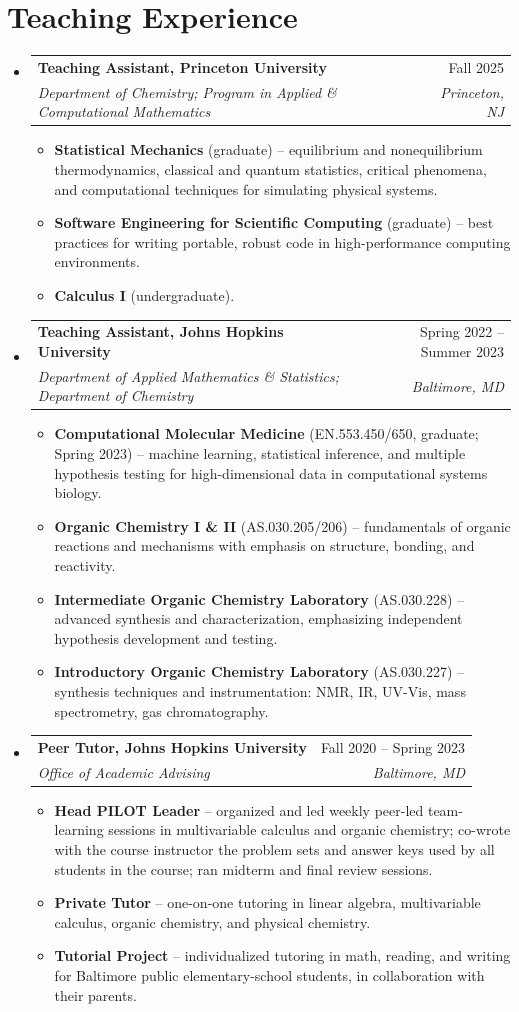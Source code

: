 \documentclass[letterpaper,10pt]{article}
\makeatletter
\newcommand{\resumeItem}[1]{\item\small{{#1 \vspace{-1pt}}}}
\newcommand{\resumeSubheading}[4]{
  \vspace{-1pt}\item
    \begin{tabular*}{0.97\textwidth}[t]{l@{\extracolsep{\fill}}r}
      \textbf{#1} & #2 \\
      \textit{\small#3} & \textit{\small #4} \\
    \end{tabular*}\vspace{-6pt}
}
\newcommand{\resumeSubHeadingListStart}{\begin{itemize}[leftmargin=0.15in, label={}]}
\newcommand{\resumeSubHeadingListEnd}{\end{itemize}}
\newcommand{\resumeItemListStart}{\begin{itemize}[itemsep=0pt, topsep=2pt]}
\newcommand{\resumeItemListEnd}{\end{itemize}\vspace{-4pt}}
\makeatother
\begin{document}
\section{Teaching Experience}
  \resumeSubHeadingListStart
    \resumeSubheading
      {Teaching Assistant, Princeton University}{Fall 2025}
      {\textnormal{Department of Chemistry; Program in Applied \& Computational Mathematics}}{Princeton, NJ}
      \resumeItemListStart
        \resumeItem{\textbf{Statistical Mechanics} (graduate) -- equilibrium and nonequilibrium thermodynamics, classical and quantum statistics, critical phenomena, and computational techniques for simulating physical systems.}
        \resumeItem{\textbf{Software Engineering for Scientific Computing} (graduate) -- best practices for writing portable, robust code in high-performance computing environments.}
        \resumeItem{\textbf{Calculus I} (undergraduate).}
      \resumeItemListEnd
    \resumeSubheading
      {Teaching Assistant, Johns Hopkins University}{Spring 2022 -- Summer 2023}
      {\textnormal{Department of Applied Mathematics \& Statistics; Department of Chemistry}}{Baltimore, MD}
      \resumeItemListStart
        \resumeItem{\textbf{Computational Molecular Medicine} (EN.553.450/650, graduate; Spring 2023) -- machine learning, statistical inference, and multiple hypothesis testing for high-dimensional data in computational systems biology.}
        \resumeItem{\textbf{Organic Chemistry I \& II} (AS.030.205/206) -- fundamentals of organic reactions and mechanisms with emphasis on structure, bonding, and reactivity.}
        \resumeItem{\textbf{Intermediate Organic Chemistry Laboratory} (AS.030.228) -- advanced synthesis and characterization, emphasizing independent hypothesis development and testing.}
        \resumeItem{\textbf{Introductory Organic Chemistry Laboratory} (AS.030.227) -- synthesis techniques and instrumentation: NMR, IR, UV-Vis, mass spectrometry, gas chromatography.}
      \resumeItemListEnd
    \resumeSubheading
      {Peer Tutor, Johns Hopkins University}{Fall 2020 -- Spring 2023}
      {\textnormal{Office of Academic Advising}}{Baltimore, MD}
      \resumeItemListStart
        \resumeItem{\textbf{Head PILOT Leader} -- organized and led weekly peer-led team-learning sessions in multivariable calculus and organic chemistry; co-wrote with the course instructor the problem sets and answer keys used by all students in the course; ran midterm and final review sessions.}
        \resumeItem{\textbf{Private Tutor} -- one-on-one tutoring in linear algebra, multivariable calculus, organic chemistry, and physical chemistry.}
        \resumeItem{\textbf{Tutorial Project} -- individualized tutoring in math, reading, and writing for Baltimore public elementary-school students, in collaboration with their parents.}
      \resumeItemListEnd
  \resumeSubHeadingListEnd
\end{document}
